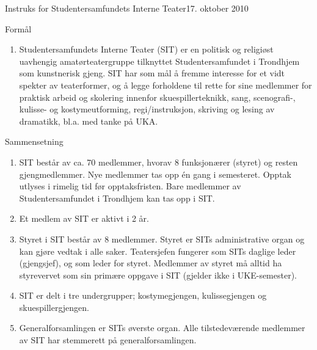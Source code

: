 
\begin{instruks}{Instruks for Studentersamfundets Interne Teater}{17. oktober 2010}{ }

    \begin{instruksledd}{Formål}
        \begin{enumerate}
            \item Studentersamfundets Interne Teater (SIT) er en politisk og religiøst uavhengig
                amatørteatergruppe tilknyttet Studentersamfundet i Trondhjem som kunstnerisk gjeng. SIT har som mål
                å fremme interesse for et vidt spekter av teaterformer, og å legge forholdene til rette for sine
                medlemmer for praktisk arbeid og skolering innenfor skuespillerteknikk, sang, scenografi-, kulisse-
                og kostymeutforming, regi/instruksjon, skriving og lesing av dramatikk, bl.a. med tanke på UKA.
        \end{enumerate}
    \end{instruksledd}

    \begin{instruksledd}{Sammensetning}
        \begin{enumerate}
            \item SIT består av ca. 70 medlemmer, hvorav 8 funksjonærer (styret) og resten
                gjengmedlemmer. Nye medlemmer tas opp én gang i semesteret. Opptak utlyses i rimelig tid før
                opptaksfristen. Bare medlemmer av Studentersamfundet i Trondhjem kan tas opp i SIT.
            \item Et medlem av SIT er aktivt i 2 år.
            \item Styret i SIT består av 8 medlemmer. Styret er SITs administrative organ og kan
                gjøre vedtak i alle saker. Teatersjefen fungerer som SITs daglige leder (gjengsjef), og som leder
                for styret. Medlemmer av styret må alltid ha styrevervet som sin primære oppgave i SIT (gjelder ikke
                i UKE-semester).
            \item SIT er delt i tre undergrupper; kostymegjengen, kulissegjengen og
                skuespillergjengen.
            \item  Generalforsamlingen er SITs øverste organ. Alle tilstedeværende medlemmer
                av SIT har stemmerett på generalforsamlingen.
        \end{enumerate}
    \end{instruksledd}


\end{instruks}
